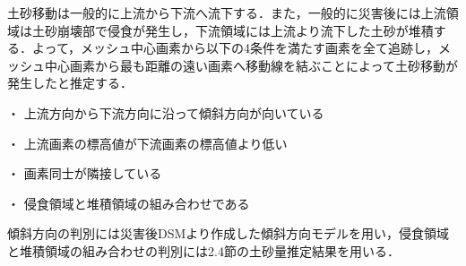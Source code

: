     土砂移動は一般的に上流から下流へ流下する．また，一般的に災害後には上流領域は土砂崩壊部で侵食が発生し，下流領域には上流より流下した土砂が堆積する．よって，メッシュ中心画素から以下の4条件を満たす画素を全て追跡し，メッシュ中心画素から最も距離の遠い画素へ移動線を結ぶことによって土砂移動が発生したと推定する．

    ・	上流方向から下流方向に沿って傾斜方向が向いている

    ・	上流画素の標高値が下流画素の標高値より低い
    
    ・	画素同士が隣接している
    
    ・	侵食領域と堆積領域の組み合わせである

    傾斜方向の判別には災害後DSMより作成した傾斜方向モデルを用い，侵食領域と堆積領域の組み合わせの判別には2.4節の土砂量推定結果を用いる．
  

